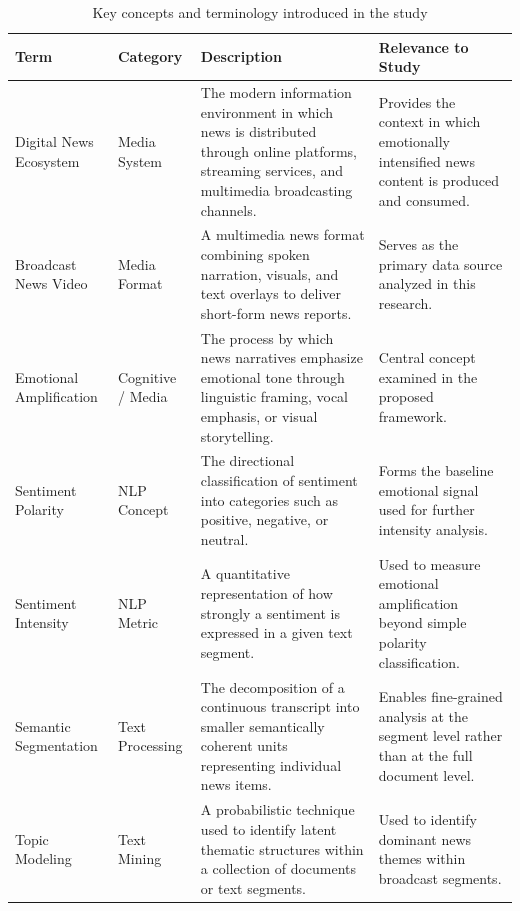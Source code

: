 \documentclass[final,1p,times]{elsarticle}
\begin{document}
\begin{table}[H]
\centering
\caption{Key concepts and terminology introduced in the study}
\label{tab:intro_terms}
\scriptsize
\setlength{\tabcolsep}{3pt}
\renewcommand{\arraystretch}{1.1}
\begin{tabular}{p{2.3cm} p{1.6cm} p{3.6cm} p{3.0cm}}
\hline
\textbf{Term} & \textbf{Category} & \textbf{Description} & \textbf{Relevance to Study} \\
\hline
Digital News Ecosystem & Media System &
The modern information environment in which news is distributed through online platforms, streaming services, and multimedia broadcasting channels. &
Provides the context in which emotionally intensified news content is produced and consumed. \\

Broadcast News Video & Media Format &
A multimedia news format combining spoken narration, visuals, and text overlays to deliver short-form news reports. &
Serves as the primary data source analyzed in this research. \\

Emotional Amplification & Cognitive / Media &
The process by which news narratives emphasize emotional tone through linguistic framing, vocal emphasis, or visual storytelling. &
Central concept examined in the proposed framework. \\

Sentiment Polarity & NLP Concept &
The directional classification of sentiment into categories such as positive, negative, or neutral. &
Forms the baseline emotional signal used for further intensity analysis. \\

Sentiment Intensity & NLP Metric &
A quantitative representation of how strongly a sentiment is expressed in a given text segment. &
Used to measure emotional amplification beyond simple polarity classification. \\

Semantic Segmentation & Text Processing &
The decomposition of a continuous transcript into smaller semantically coherent units representing individual news items. &
Enables fine-grained analysis at the segment level rather than at the full document level. \\

Topic Modeling & Text Mining &
A probabilistic technique used to identify latent thematic structures within a collection of documents or text segments. &
Used to identify dominant news themes within broadcast segments. \\


\end{tabular}
\end{table}
\end{document}
